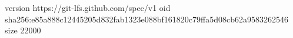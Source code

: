 version https://git-lfs.github.com/spec/v1
oid sha256:e85a888c12445205d832fab1323e088bf161820c79ffa5d08cb62a9583262546
size 22000

